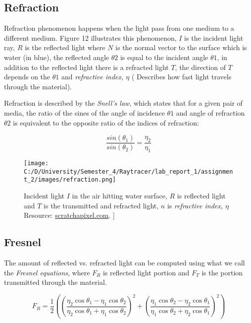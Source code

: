 \documentclass{article}
\begin{document}
	      \subsection{Refraction}
	      Refraction phenomenon happens when the light pass from one medium to a different medium.
	      Figure 12 illustrates this phenomenon, $I$ is the incident light ray, $R$ is the reflected light where $N$ is the normal vector to the surface which is water (in blue), the reflected angle  $\theta2$ is equal to the incident angle $\theta1$, in addition to the reflected light there is a refracted light $T$, the direction of $T$ depends on the $\theta1$ and \textit{refractive index, $\eta$} ( Describes how fast light travels through the material).
	      
	      Refraction is described by the \textit{Snell's law}, which states that for a given pair of media, the ratio of the sines of the angle of incidence $\theta1$ and angle of refraction $\theta2$ is equivalent to the opposite ratio of the indices of refraction: 
	      
	      \begin{equation}
\frac{sin(\theta_1)}{sin(\theta_2)} = \frac{\eta_2}{\eta_1} 
	      \end{equation}
      
	      
	\begin{figure}[H]
	\begin{center}
		\texttt{[image: C:/D/University/Semester\_4/Raytracer/lab\_report\_1/assignment\_2/images/refraction.png]}
		
		\caption{Incident light $I$ in the air hitting water surface, $R$ is reflected light and $T$ is the transmitted and refracted light, $n$ is \textit{refractive index, $\eta$  } Resource: \href{https://www.scratchapixel.com/images/upload/shading-intro/shad-refraction6.png?}{scratchapixel.com}.
			]}
	\end{center}
\end{figure}

\subsection{Fresnel}
The amount of reflected vs. refracted light can be computed using what we call the \textit{Fresnel equations}, where $F_R$ is reflected light portion and $F_T$ is the portion transmitted through the material. 

\begin{equation}
 F_R = \dfrac{1}{2}(\left( \dfrac{\eta_2 \cos\theta_1 - \eta_1 \cos \theta_2}{\eta_2 \cos\theta_1 + \eta_1 \cos \theta_2} \right)^2 + \left( \dfrac{\eta_1 \cos\theta_2 - \eta_2 \cos \theta_1}{\eta_1 \cos\theta_2 + \eta_2 \cos \theta_1} \right)^2)
\end{equation}
\end{document}
